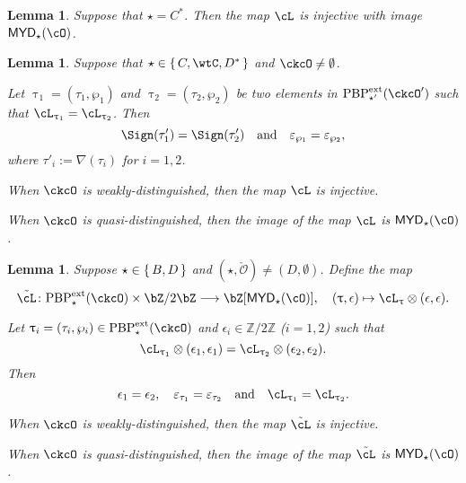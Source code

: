\documentclass[12pt,a4paper]{amsart}
\newcommand{\AC}{\mathrm{AC}}
\def\MYD{{\mathsf{MYD}}}
\newcommand{\CO}{{\mathcal {O}}}
\newcommand{\Z}{\mathbb{Z}}
\def\DD{\nabla}
\numberwithin{equation}{section}
\newtheorem{lem}[thm]{Lemma}
\theoremstyle{remark}
\def\PBPe{\mathrm{PBP}^{\mathrm{ext}}}
\def\PBPes{\mathrm{PBP}^{\mathrm{ext}}_{\star}}
\def\PBPesp{\mathrm{PBP}^{\mathrm{ext}}_{\star'}}
\def\ckcOp{\ckcO^{\prime}}
\def\cOp{\cO^{\prime}}
\begin{document}
\begin{lem}\label{lem:C*}
Suppose that $\star = C^{*}$. Then the map $\acm$
        is injective with image $\MYD_{\star}(\cO)$.
\end{lem}
\begin{lem}\label{lem:C}
  Suppose that $\star \in \set{C,\wtC,D^{*}}$ and $\ckcO\neq \emptyset$.
  \begin{enuma}
    \item Let $\uptau_{1} = (\tau_{1},\wp_{1})$ and
    $\uptau_{2}=(\tau_{2},\wp_{2})$ be two elements in $\PBPesp(\ckcOp)$ such
    that $\ac_{\uptau_{1}} =  \ac_{\uptau_{2}}$. Then
    \[
      \Sign(\tau'_{1})=\Sign(\tau'_{2}) \quad \text{and} \quad
    \varepsilon_{\wp_{1}}=\varepsilon_{\wp_{2}}, \]
    where $\tau'_{i} :=
    \DD(\tau_{i})$ for $i=1,2$.
    \item When $\ckcO$ is weakly-distinguished, then the map $\acm$ is injective.
    \item When $\ckcO$ is quasi-distinguished, then the image of the map $\acm$ is $\MYD_{\star}(\cO)$.
  \end{enuma}
\end{lem}


\begin{lem}\label{lem:BD}
Suppose $\star \in \set{B,D}$ and $(\star, \check \CO)\neq (D, \emptyset)$. Define the map
 \[
    \acme \colon
    \PBPes( \ckcO )\times \bZ/2\bZ \longrightarrow \bZ[\MYD_{\star}(\cO)],\quad
    (\uptau,\epsilon) \mapsto \ac_{\uptau}\otimes (\epsilon, \epsilon).
  \]
  \begin{enuma}
  \item Let $\uptau_i=(\tau_i, \wp_i)\in \PBPe_\star(\ckcO)$ and
  $\epsilon_i\in \Z/2\Z$ ($i=1,2$) such that
  \[
    \ac_{\uptau_1}\lotimes (\epsilon_{1},\epsilon_{1})= \ac_{\uptau_2}\lotimes( \epsilon_{2},\epsilon_{2} ).
  \]
  Then
  \[
    \epsilon_1=\epsilon_2,\quad \varepsilon_{\tau_1}=\varepsilon_{\tau_2} \AND \ac_{\uptau_{1}}=\ac_{\uptau_{2}}.
  \]

  \item When $\ckcO$ is weakly-distinguished, then the map $\acme$ is injective.
  \item When $\ckcO$ is quasi-distinguished, then the image of the map $\acme$ is $\MYD_{\star}(\cO)$.
\end{enuma}
\end{lem}
\end{document}
